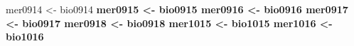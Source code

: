 \documentclass[
]{article}
\newenvironment{Shaded}{\begin{snugshade}}{\end{snugshade}}
\newcommand{\KeywordTok}[1]{\textcolor[rgb]{0.13,0.29,0.53}{\textbf{#1}}}
\newcommand{\NormalTok}[1]{#1}
\newcommand{\OperatorTok}[1]{\textcolor[rgb]{0.81,0.36,0.00}{\textbf{#1}}}
\newcommand{\StringTok}[1]{\textcolor[rgb]{0.31,0.60,0.02}{#1}}
\begin{document}
\begin{Shaded}
\begin{Highlighting}[]
\NormalTok{mer0914 <-}\StringTok{ }\NormalTok{bio0914 }\OperatorTok{%>%}\StringTok{ }\KeywordTok{select}\NormalTok{(}\StringTok{'COUNTY_PLOT_SUB'}\NormalTok{, }\StringTok{'bio_change'}\NormalTok{,}\StringTok{'SPCD'}\NormalTok{,}\StringTok{'STDAGE'}\NormalTok{,}\StringTok{'BA'}\NormalTok{,}\StringTok{"COUNTY_PLOT"}\NormalTok{,}\StringTok{"tpha"}\NormalTok{)}
\NormalTok{mer0915 <-}\StringTok{ }\NormalTok{bio0915 }\OperatorTok{%>%}\StringTok{ }\KeywordTok{select}\NormalTok{(}\StringTok{'COUNTY_PLOT_SUB'}\NormalTok{, }\StringTok{'bio_change'}\NormalTok{,}\StringTok{'SPCD'}\NormalTok{,}\StringTok{'STDAGE'}\NormalTok{,}\StringTok{'BA'}\NormalTok{,}\StringTok{"COUNTY_PLOT"}\NormalTok{,}\StringTok{"tpha"}\NormalTok{)}
\NormalTok{mer0916 <-}\StringTok{ }\NormalTok{bio0916 }\OperatorTok{%>%}\StringTok{ }\KeywordTok{select}\NormalTok{(}\StringTok{'COUNTY_PLOT_SUB'}\NormalTok{, }\StringTok{'bio_change'}\NormalTok{,}\StringTok{'SPCD'}\NormalTok{,}\StringTok{'STDAGE'}\NormalTok{,}\StringTok{'BA'}\NormalTok{,}\StringTok{"COUNTY_PLOT"}\NormalTok{,}\StringTok{"tpha"}\NormalTok{)}
\NormalTok{mer0917 <-}\StringTok{ }\NormalTok{bio0917 }\OperatorTok{%>%}\StringTok{ }\KeywordTok{select}\NormalTok{(}\StringTok{'COUNTY_PLOT_SUB'}\NormalTok{, }\StringTok{'bio_change'}\NormalTok{,}\StringTok{'SPCD'}\NormalTok{,}\StringTok{'STDAGE'}\NormalTok{,}\StringTok{'BA'}\NormalTok{,}\StringTok{"COUNTY_PLOT"}\NormalTok{,}\StringTok{"tpha"}\NormalTok{)}
\NormalTok{mer0918 <-}\StringTok{ }\NormalTok{bio0918 }\OperatorTok{%>%}\StringTok{ }\KeywordTok{select}\NormalTok{(}\StringTok{'COUNTY_PLOT_SUB'}\NormalTok{, }\StringTok{'bio_change'}\NormalTok{,}\StringTok{'SPCD'}\NormalTok{,}\StringTok{'STDAGE'}\NormalTok{,}\StringTok{'BA'}\NormalTok{,}\StringTok{"COUNTY_PLOT"}\NormalTok{,}\StringTok{"tpha"}\NormalTok{)}
\NormalTok{mer1015 <-}\StringTok{ }\NormalTok{bio1015 }\OperatorTok{%>%}\StringTok{ }\KeywordTok{select}\NormalTok{(}\StringTok{'COUNTY_PLOT_SUB'}\NormalTok{, }\StringTok{'bio_change'}\NormalTok{,}\StringTok{'SPCD'}\NormalTok{,}\StringTok{'STDAGE'}\NormalTok{,}\StringTok{'BA'}\NormalTok{,}\StringTok{"COUNTY_PLOT"}\NormalTok{,}\StringTok{"tpha"}\NormalTok{)}
\NormalTok{mer1016 <-}\StringTok{ }\NormalTok{bio1016 }\OperatorTok{%>%}\StringTok{ }\KeywordTok{select}\NormalTok{(}\StringTok{'COUNTY_PLOT_SUB'}\NormalTok{, }\StringTok{'bio_change'}\NormalTok{,}\StringTok{'SPCD'}\NormalTok{,}\StringTok{'STDAGE'}\NormalTok{,}\StringTok{'BA'}\NormalTok{,}\StringTok{"COUNTY_PLOT"}\NormalTok{,}\StringTok{"tpha"}\NormalTok{)}
}}}}}}}
\end{Highlighting}
\end{Shaded}
\end{document}

